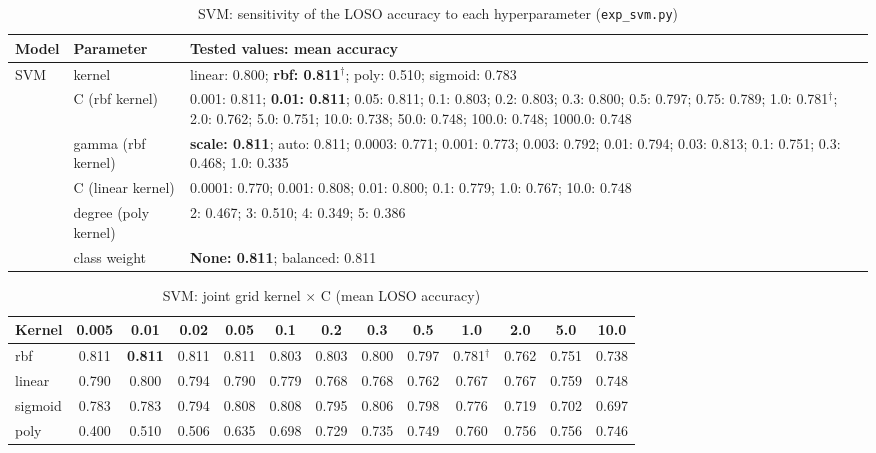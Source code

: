 \begin{table}[!htb]
    \centering
    \caption{SVM: sensitivity of the LOSO accuracy to each hyperparameter (\texttt{exp\_svm.py})}
    \label{tab:sens_svm}
    \small
    \begin{tabularx}{\textwidth}{@{} l l X @{}}
        \toprule
        \textbf{Model} & \textbf{Parameter} & \textbf{Tested values: mean accuracy} \\
        \midrule
        SVM & kernel & linear: 0.800; \textbf{rbf: 0.811$^{\dagger}$}; poly: 0.510; sigmoid: 0.783 \\
         & C (rbf kernel) & 0.001: 0.811; \textbf{0.01: 0.811}; 0.05: 0.811; 0.1: 0.803; 0.2: 0.803; 0.3: 0.800; 0.5: 0.797; 0.75: 0.789; 1.0: 0.781$^{\dagger}$; 2.0: 0.762; 5.0: 0.751; 10.0: 0.738; 50.0: 0.748; 100.0: 0.748; 1000.0: 0.748 \\
         & gamma (rbf kernel) & \textbf{scale: 0.811}; auto: 0.811; 0.0003: 0.771; 0.001: 0.773; 0.003: 0.792; 0.01: 0.794; 0.03: 0.813; 0.1: 0.751; 0.3: 0.468; 1.0: 0.335 \\
         & C (linear kernel) & 0.0001: 0.770; 0.001: 0.808; 0.01: 0.800; 0.1: 0.779; 1.0: 0.767; 10.0: 0.748 \\
         & degree (poly kernel) & 2: 0.467; 3: 0.510; 4: 0.349; 5: 0.386 \\
         & class weight & \textbf{None: 0.811}; balanced: 0.811 \\
        \bottomrule
    \end{tabularx}
\end{table}

\begin{table}[!htb]
    \centering
    \caption{SVM: joint grid kernel $\times$ C (mean LOSO accuracy)}
    \label{tab:grid_svm}
    \footnotesize
    \setlength{\tabcolsep}{3pt}
    \begin{tabular*}{\textwidth}{@{\extracolsep{\fill}} l c c c c c c c c c c c c @{}}
        \toprule
        \textbf{Kernel} & \textbf{0.005} & \textbf{0.01} & \textbf{0.02} & \textbf{0.05} & \textbf{0.1} & \textbf{0.2} & \textbf{0.3} & \textbf{0.5} & \textbf{1.0} & \textbf{2.0} & \textbf{5.0} & \textbf{10.0} \\
        \midrule
        rbf & 0.811 & \textbf{0.811} & 0.811 & 0.811 & 0.803 & 0.803 & 0.800 & 0.797 & 0.781$^{\dagger}$ & 0.762 & 0.751 & 0.738 \\
        linear & 0.790 & 0.800 & 0.794 & 0.790 & 0.779 & 0.768 & 0.768 & 0.762 & 0.767 & 0.767 & 0.759 & 0.748 \\
        sigmoid & 0.783 & 0.783 & 0.794 & 0.808 & 0.808 & 0.795 & 0.806 & 0.798 & 0.776 & 0.719 & 0.702 & 0.697 \\
        poly & 0.400 & 0.510 & 0.506 & 0.635 & 0.698 & 0.729 & 0.735 & 0.749 & 0.760 & 0.756 & 0.756 & 0.746 \\
        \bottomrule
    \end{tabular*}
\end{table}

